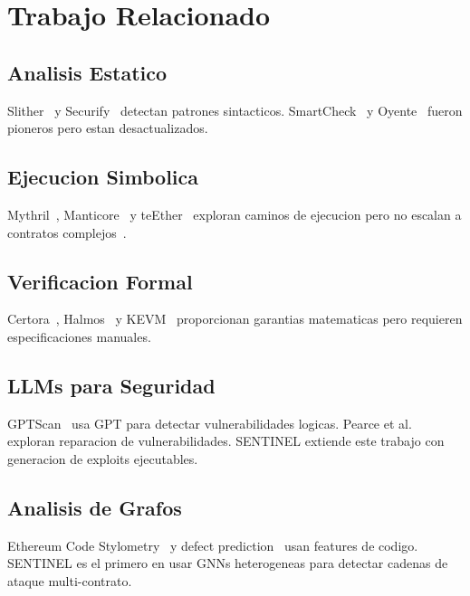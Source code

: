 \documentclass[11pt]{article}
\theoremstyle{definition}
\theoremstyle{plain}
\theoremstyle{remark}
\begin{document}
\section{Trabajo Relacionado}
\label{sec:relacionado}

\subsection{Analisis Estatico}

Slither~\cite{feist2019slither} y Securify~\cite{tsankov2018securify} detectan patrones sintacticos. SmartCheck~\cite{tikhomirov2018smartcheck} y Oyente~\cite{luu2016making} fueron pioneros pero estan desactualizados.

\subsection{Ejecucion Simbolica}

Mythril~\cite{mueller2018mythril}, Manticore~\cite{mossberg2019manticore} y teEther~\cite{krupp2018teether} exploran caminos de ejecucion pero no escalan a contratos complejos~\cite{durieux2020empirical}.

\subsection{Verificacion Formal}

Certora~\cite{certora2023}, Halmos~\cite{halmos2023} y KEVM~\cite{hildenbrandt2018kevm} proporcionan garantias matematicas pero requieren especificaciones manuales.

\subsection{LLMs para Seguridad}

GPTScan~\cite{sun2023gptscan} usa GPT para detectar vulnerabilidades logicas. Pearce et al.~\cite{pearce2023examining} exploran reparacion de vulnerabilidades. SENTINEL extiende este trabajo con generacion de exploits ejecutables.

\subsection{Analisis de Grafos}

Ethereum Code Stylometry~\cite{chen2020survey} y defect prediction~\cite{liu2021combining} usan features de codigo. SENTINEL es el primero en usar GNNs heterogeneas para detectar cadenas de ataque multi-contrato.
\end{document}
